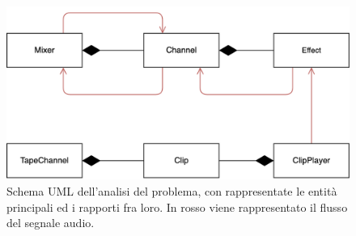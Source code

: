 \documentclass[a4paper,12pt]{report}
\begin{document}
\begin{figure}[H]
\centering{}
\includegraphics[scale=1.7]{img/domain.png}
\caption{Schema UML dell'analisi del problema, con rappresentate le entità principali ed i rapporti fra loro. In rosso viene rappresentato il flusso del segnale audio.}
\end{figure}
\end{document}
